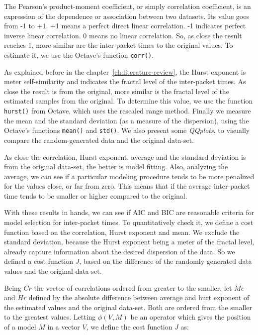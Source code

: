 The Pearson's product-moment coefficient, or simply correlation coefficient,  is an expression of the dependence or association between two datasets. Its value goes from -1 to +1. +1 means a perfect direct linear correlation. -1 indicates perfect inverse linear correlation. 0 means no linear correlation. So, as close the result reaches 1, more similar are the inter-packet times to the original values. To estimate it, we use the Octave's function \texttt{corr()}.

As explained before in the chapter~\ref{ch:literature-review}, the Hurst exponent is meter self-similarity and indicates the fractal level of the inter-packet times. As close the result is from the original, more similar is the fractal level of the estimated samples from the original. To determine this value, we use the function \texttt{hurst()} from Octave, which uses the rescaled range method.
Finally we measure the mean and the standard deviation (as a measure of the dispersion), using the Octave's functions \texttt{mean()} and \texttt{std()}. We also present some \textit{QQplots}, to visually compare the random-generated data and the original data-set.

As close the correlation, Hurst exponent, average and the standard deviation is from the original data-set, the better is model fitting. Also, analyzing the average, we can see if a particular modeling procedure tends to be more penalized for the values close, or far from zero. This means that if the average inter-packet time tends to be smaller or higher compared to the original. 

With these results in hands, we can see if AIC and BIC are reasonable criteria for model selection for inter-packet times. To quantitatively check it, we define a cost function based on the correlation, Hurst exponent and mean. We exclude the standard deviation, because the Hurst exponent being a meter of the fractal level, already capture information about the desired dispersion of the data. So we defined a cost function $J$, based on the difference of the randomly generated data values and the original data-set.

Being $Cr$ the vector of correlations ordered from greater to the smaller, let $Me$ and $Hr$ defined by the absolute difference between average and hurt exponent of the estimated values and the original data-set. Both are ordered from the smaller to the greatest values. Letting $\phi(V, M)$ be an operator which gives the position of a model $M$ in a vector $V$, we define the cost function $J$ as:


